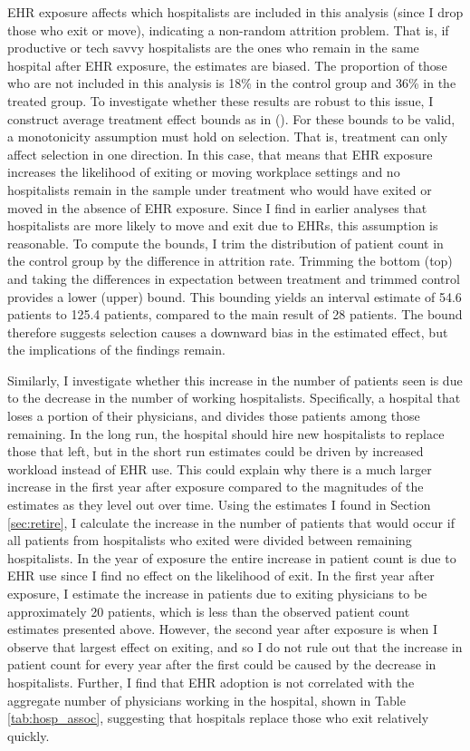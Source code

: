 \documentclass[12pt]{article}
\begin{document}
EHR exposure affects which hospitalists are included in this analysis (since I drop those who exit or move), indicating a non-random attrition problem. That is, if productive or tech savvy hospitalists are the ones who remain in the same hospital after EHR exposure, the estimates are biased. The proportion of those who are not included in this analysis is 18\% in the control group and 36\% in the treated group. To investigate whether these results are robust to this issue, I construct average treatment effect bounds as in  \citeauthor{lee2009training} (\citeyear{lee2009training}). For these bounds to be valid, a monotonicity assumption must hold on selection. That is, treatment can only affect selection in one direction. In this case, that means that EHR exposure increases the likelihood of exiting or moving workplace settings and no hospitalists remain in the sample under treatment who would have exited or moved in the absence of EHR exposure. Since I find in earlier analyses that hospitalists are more likely to move and exit due to EHRs, this assumption is reasonable. To compute the bounds, I trim the distribution of patient count in the control group by the difference in attrition rate. Trimming the bottom (top) and taking the differences in expectation between treatment and trimmed control provides a lower (upper) bound. This bounding yields an interval estimate of 54.6 patients to 125.4 patients, compared to the main result of 28 patients. The bound therefore suggests selection causes a downward bias in the estimated effect, but the implications of the findings remain.

Similarly, I investigate whether this increase in the number of patients seen is due to the decrease in the number of working hospitalists. Specifically, a hospital that loses a portion of their physicians, and divides those patients among those remaining. In the long run, the hospital should hire new hospitalists to replace those that left, but in the short run estimates could be driven by increased workload instead of EHR use. This could explain why there is a much larger increase in the first year after exposure compared to the magnitudes of the estimates as they level out over time. Using the estimates I found in Section \ref{sec:retire}, I calculate the increase in the number of patients that would occur if all patients from hospitalists who exited were divided between remaining hospitalists. In the year of exposure the entire increase in patient count is due to EHR use since I find no effect on the likelihood of exit. In the first year after exposure, I estimate the increase in patients due to exiting physicians to be approximately 20 patients, which is less than the observed patient count estimates presented above. However, the second year after exposure is when I observe that largest effect on exiting, and so I do not rule out that the increase in patient count for every year after the first could be caused by the decrease in hospitalists. Further, I find that EHR adoption is not correlated with the aggregate number of physicians working in the hospital, shown in Table \ref{tab:hosp_assoc}, suggesting that hospitals replace those who exit relatively quickly.
\end{document}
